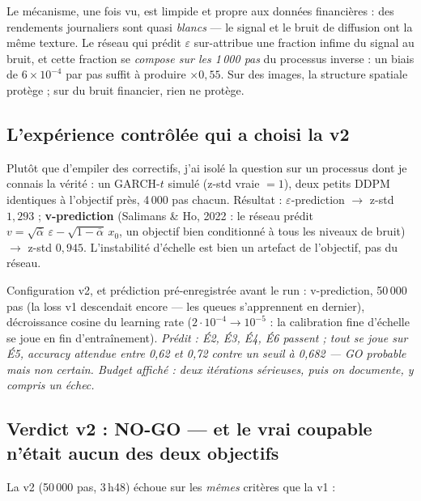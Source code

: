 \documentclass[11pt,a4paper]{article}
\begin{document}
Le mécanisme, une fois vu, est limpide et propre aux données financières : des
rendements journaliers sont quasi \emph{blancs} --- le signal et le bruit de diffusion
ont la même texture. Le réseau qui prédit $\varepsilon$ sur-attribue une fraction
infime du signal au bruit, et cette fraction se \emph{compose sur les 1\,000 pas} du
processus inverse : un biais de $6 \times 10^{-4}$ par pas suffit à produire
$\times 0{,}55$. Sur des images, la structure spatiale protège ; sur du bruit financier,
rien ne protège.

\subsection{L'expérience contrôlée qui a choisi la v2}

Plutôt que d'empiler des correctifs, j'ai isolé la question sur un processus dont je
connais la vérité : un GARCH-$t$ simulé (z-std vraie $=1$), deux petits DDPM identiques
à l'objectif près, 4\,000 pas chacun. Résultat : $\varepsilon$-prediction $\to$ z-std
$1{,}293$ ; \textbf{v-prediction} (Salimans \& Ho, 2022 : le réseau prédit
$v = \sqrt{\bar\alpha}\,\varepsilon - \sqrt{1-\bar\alpha}\,x_0$, un objectif bien
conditionné à tous les niveaux de bruit) $\to$ z-std $0{,}945$. L'instabilité d'échelle
est bien un artefact de l'objectif, pas du réseau.

Configuration v2, et prédiction pré-enregistrée avant le run : v-prediction, 50\,000
pas (la loss v1 descendait encore --- les queues s'apprennent en dernier), décroissance
cosine du learning rate ($2\cdot10^{-4} \to 10^{-5}$ : la calibration fine d'échelle se
joue en fin d'entraînement). \emph{Prédit : É2, É3, É4, É6 passent ; tout se joue sur
É5, accuracy attendue entre 0{,}62 et 0{,}72 contre un seuil à 0{,}682 --- GO probable
mais non certain. Budget affiché : deux itérations sérieuses, puis on documente,
y compris un échec.}

\subsection{Verdict v2 : NO-GO --- et le vrai coupable n'était aucun des deux objectifs}

La v2 (50\,000 pas, 3\,h48) échoue sur les \emph{mêmes} critères que la v1 :
\end{document}
